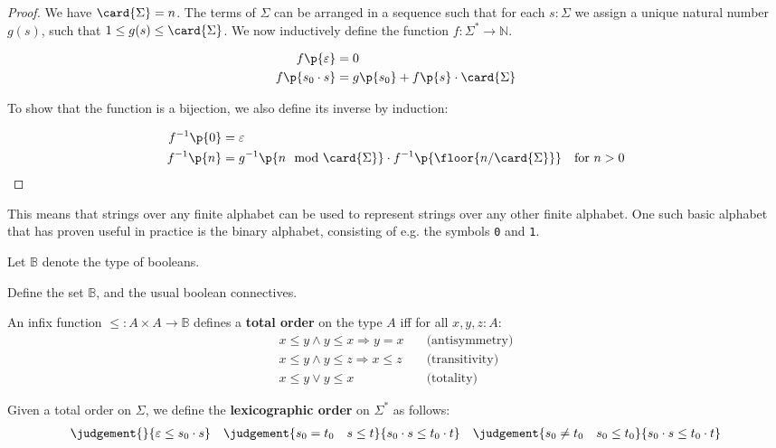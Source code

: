 \begin{proof} We have $\card{\Sigma} = n$. The terms of $\Sigma$ can be
arranged in a sequence such that for each $s:\Sigma$ we assign a unique natural
number $g(s)$, such that $1 \leq g(s) \leq \card{\Sigma}$. We now inductively
define the function $f:\Sigma^*\rightarrow \mathbb{N}$.

\begin{align}
f\p{\varepsilon} &= 0 \\
f\p{s_0\cdot s} &= g\p{s_0} + f\p{s} \cdot \card{\Sigma}
\end{align}

To show that the function is a bijection, we also define its inverse by
induction:

\begin{align}
f^{-1}\p{0} &= \varepsilon \\
f^{-1}\p{n} &= g^{-1}\p{n \mod \card{\Sigma}} \cdot f^{-1}\p{\floor{n/\card{\Sigma}}} & \text{for $n>0$}
\end{align}

\end{proof}

This means that strings over any finite alphabet can be used to represent
strings over any other finite alphabet. One such basic alphabet that has proven
useful in practice is the binary alphabet, consisting of e.g. the symbols
\texttt{0} and \texttt{1}.

\begin{definition} Let $\mathbb{B}$ denote the type of booleans.\end{definition}

Define the set $\mathbb{B}$, and the usual boolean connectives.

\begin{definition} An infix function $\leq : A\times A \rightarrow \mathbb{B}$ defines a
\textbf{total order} on the type $A$ iff for all $x,y,z : A$:
\begin{align}
x \leq y \wedge y \leq x \Rightarrow y = x  & \quad \text{(antisymmetry)} \\
x \leq y \wedge y \leq z \Rightarrow x \leq z & \quad \text{(transitivity)} \\
x \leq y \vee y \leq x & \quad \text{(totality)}
\end{align}
\end{definition}

\begin{definition} Given a total order on $\Sigma$, we define the
\textbf{lexicographic order} on $\Sigma^*$ as follows:
\begin{align}
\judgement{}{\varepsilon \leq s_0\cdot s}
\quad
\judgement{s_0 = t_0 \quad s \leq t}{s_0\cdot s \leq t_0 \cdot t}
\quad
\judgement{s_0 \neq t_0 \quad s_0 \leq t_0}{s_0 \cdot s \leq t_0 \cdot t}
\end{align}
\end{definition}

